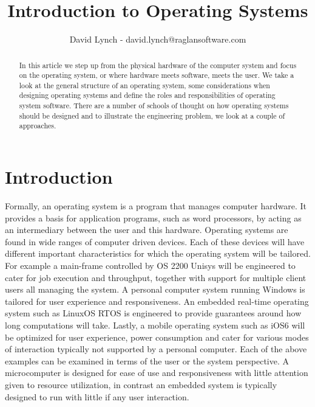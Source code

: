 \documentclass[10pt,a4paper]{article}
\title{Introduction to Operating Systems}
\author{David Lynch - david.lynch@raglansoftware.com }
\begin{document}
\maketitle
\begin{abstract}
In this article we step up from the physical hardware of the computer system and focus on the operating system, or where hardware meets software, meets the user. We take a look at the general structure of an operating system, some considerations when designing operating systems and define the roles and responsibilities of operating system software. There are a number of schools of thought on how operating systems should be designed and to illustrate the engineering problem, we look at a couple of approaches. 
\end{abstract}
\section{Introduction}
Formally, an operating system is a program that manages computer hardware. It provides a basis for application programs, such as word processors, by acting as an intermediary between the user and this hardware. Operating systems are found in wide ranges of computer driven devices. Each of these devices will have different important characteristics for which the operating system will be tailored. For example a main-frame controlled by OS 2200 Unisys will be engineered to cater for job execution and throughput, together with support for  multiple client users all managing the system. A personal computer system running Windows is tailored for user experience and responsiveness. An embedded real-time operating system such as LinuxOS RTOS is engineered to provide guarantees around how long computations will take. Lastly, a mobile operating system such as iOS6 will be optimized for user experience, power consumption and cater for various modes of interaction typically not supported by a personal computer.
\newline\newline
Each of the above examples can be examined in terms of the user or the system perspective. A microcomputer is designed for ease of use and responsiveness with little attention given to resource utilization, in contrast an embedded system is typically designed to run with little if any user interaction.
\end{document}
